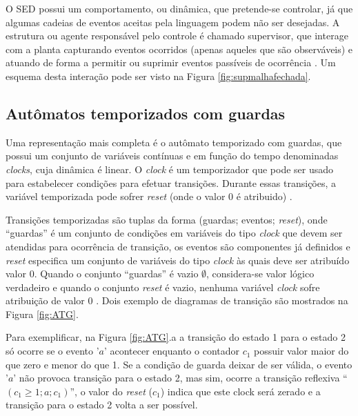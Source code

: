 O SED possui um comportamento, ou dinâmica, que pretende-se controlar, já que
algumas cadeias de eventos aceitas pela linguagem podem não ser desejadas. A
estrutura ou agente responsável pelo controle é chamado supervisor, que interage
com a planta capturando eventos ocorridos (apenas aqueles que são
observáveis) e atuando de forma a permitir ou suprimir eventos passíveis de
ocorrência \cite{book:SED}. Um esquema desta interação pode ser visto na Figura
\ref{fig:supmalhafechada}.



\subsection{Autômatos temporizados com guardas}

Uma representação mais completa é o autômato temporizado com guardas, que possui
um conjunto de variáveis contínuas e em função do tempo denominadas
\textit{clocks}, cuja dinâmica é linear. O \textit{clock} é um temporizador que pode 
ser usado para estabelecer condições para efetuar transições. Durante essas transições, a
variável temporizada pode sofrer \textit{reset} (onde o valor 0 é atribuido)
\cite{book:SED}.

Transições temporizadas são tuplas da forma (guardas; eventos;
\textit{reset}), onde ``guardas'' é um conjunto de condições em variáveis
do tipo \textit{clock} que devem ser atendidas para ocorrência de transição,
os eventos são componentes já definidos e \textit{reset} especifica um conjunto
de variáveis do tipo \textit{clock} às quais deve ser atribuído valor 0.
Quando o conjunto ``guardas'' é vazio $\emptyset$, considera-se valor
lógico verdadeiro e quando o conjunto \textit{reset} é vazio, nenhuma variável
\textit{clock} sofre atribuição de valor 0 \cite{book:SED}. Dois exemplo de
diagramas de transição são mostrados na Figura \ref{fig:ATG}. 



Para exemplificar, na Figura \ref{fig:ATG}.a a transição do estado 1 para o estado 2
só ocorre se o evento '$a$' acontecer enquanto o contador $c_1$ possuir valor maior do que 
zero e menor do que 1. Se a condição de guarda deixar de ser válida, o evento '$a$' não
provoca transição para o estado 2, mas sim, ocorre a transição reflexiva 
``$(c_1 \geq 1; a; c_1)$'', o valor do \textit{reset} ($c_1$) indica que este clock será 
zerado e a transição para o estado 2 volta a ser possível.

